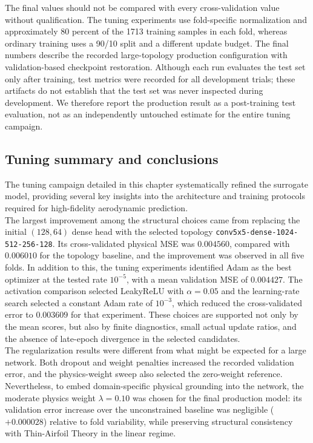 The final values should not be compared with every cross-validation value without qualification. The tuning experiments use fold-specific normalization and approximately 80 percent of the 1713 training samples in each fold, whereas ordinary training uses a 90/10 split and a different update budget. The final numbers describe the recorded large-topology production configuration with validation-based checkpoint restoration. Although each run evaluates the test set only after training, test metrics were recorded for all development trials; these artifacts do not establish that the test set was never inspected during development. We therefore report the production result as a post-training test evaluation, not as an independently untouched estimate for the entire tuning campaign.\\

\subsection{Tuning summary and conclusions}
\label{sec:04_tuning_conclusions}

The tuning campaign detailed in this chapter systematically refined the surrogate model, providing several key insights into the architecture and training protocols required for high-fidelity aerodynamic prediction.\\

The largest improvement among the structural choices came from replacing the initial $(128,64)$ dense head with the selected topology \texttt{conv5x5-dense-1024-512-256-128}. Its cross-validated physical MSE was $0.004560$, compared with $0.006010$ for the topology baseline, and the improvement was observed in all five folds. In addition to this, the tuning experiments identified Adam as the best optimizer at the tested rate $10^{-5}$, with a mean validation MSE of $0.004427$. The activation comparison selected LeakyReLU with $\alpha=0.05$ and the learning-rate search selected a constant Adam rate of $10^{-3}$, which reduced the cross-validated error to $0.003609$ for that experiment. These choices are supported not only by the mean scores, but also by finite diagnostics, small actual update ratios, and the absence of late-epoch divergence in the selected candidates.\\

The regularization results were different from what might be expected for a large network. Both dropout and weight penalties increased the recorded validation error, and the physics-weight sweep also selected the zero-weight reference. Nevertheless, to embed domain-specific physical grounding into the network, the moderate physics weight $\lambda=0.10$ was chosen for the final production model: its validation error increase over the unconstrained baseline was negligible ($+0.000028$) relative to fold variability, while preserving structural consistency with Thin-Airfoil Theory in the linear regime.\\

